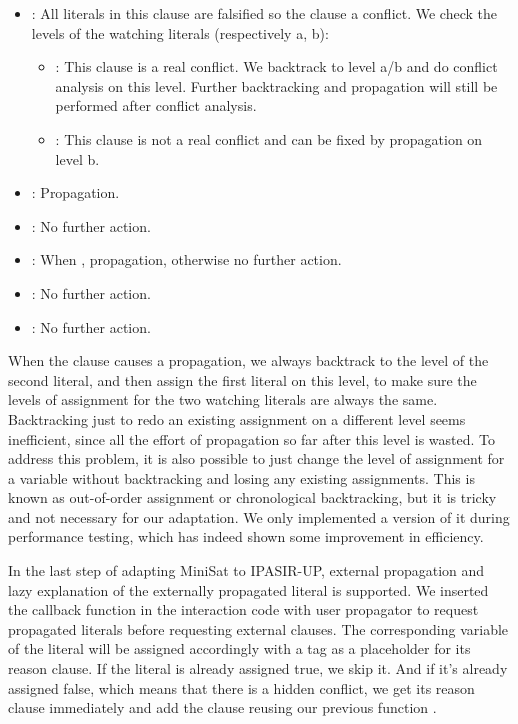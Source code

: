 \begin{itemize}
  \item {}: All literals in this clause are falsified so the clause a conflict. We check the levels of the watching literals (respectively a, b):
  \begin{itemize}
    \item {}: This clause is a real conflict. We backtrack to level a/b and do conflict analysis on this level. Further backtracking and propagation will still be performed after conflict analysis.
    \item {}: This clause is not a real conflict and can be fixed by propagation on level b.
  \end{itemize}
  \item {}: Propagation.
  \item {}: No further action.
  \item {}: When , propagation, otherwise no further action.
  \item {}: No further action.
  \item {}: No further action.
\end{itemize}

When the clause causes a propagation, we always backtrack to the level of the second literal, and then assign the first literal on this level, to make sure the levels of assignment for the two watching literals are always the same. Backtracking just to redo an existing assignment on a different level seems inefficient, since all the effort of propagation so far after this level is wasted. To address this problem, it is also possible to just change the level of assignment for a variable without backtracking and losing any existing assignments. This is known as out-of-order assignment or chronological backtracking, but it is tricky and not necessary for our adaptation. We only implemented a version of it during performance testing, which has indeed shown some improvement in efficiency.

In the last step of adapting MiniSat to IPASIR-UP, external propagation and lazy explanation of the externally propagated literal is supported. We inserted the callback function  in the interaction code with user propagator to request propagated literals before requesting external clauses. The corresponding variable of the literal will be assigned accordingly with a tag  as a placeholder for its reason clause. If the literal is already assigned true, we skip it. And if it's already assigned false, which means that there is a hidden conflict, we get its reason clause immediately and add the clause reusing our previous function .

